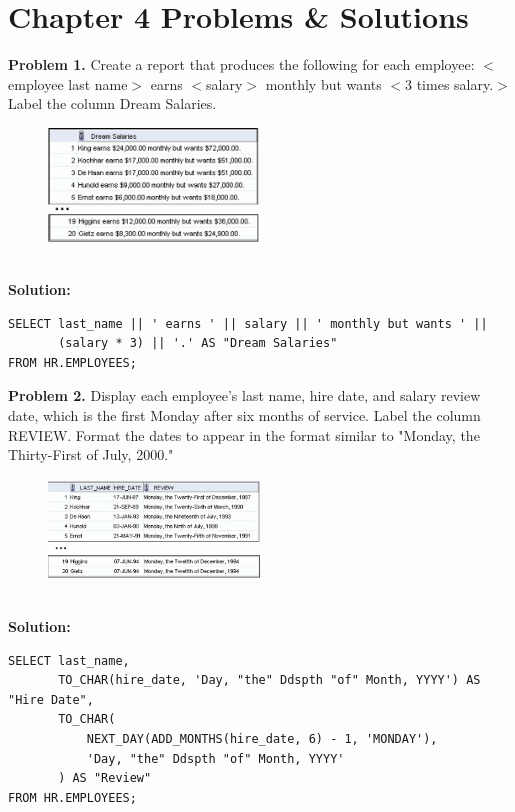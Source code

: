 \documentclass[12pt,a4paper]{article}
\begin{document}
\section{Chapter 4 Problems \& Solutions}

\textbf{Problem 1.} Create a report that produces the following for each employee: $<$employee last name$>$ earns $<$salary$>$ monthly but wants $<$3 times salary.$>$ Label the column Dream Salaries.
\begin{figure}[htbp]
  \centering
  \includegraphics[width=0.5\textwidth]{Screenshots/41.png}
\end{figure}\\
\textbf{Solution:}
\begin{lstlisting}[style=sqlstyle]
SELECT last_name || ' earns ' || salary || ' monthly but wants ' || 
       (salary * 3) || '.' AS "Dream Salaries"
FROM HR.EMPLOYEES;
\end{lstlisting}

\vspace{0.5cm}

\textbf{Problem 2.} Display each employee's last name, hire date, and salary review date, which is the first Monday after six months of service. Label the column REVIEW. Format the dates to appear in the format similar to "Monday, the Thirty-First of July, 2000."
\begin{figure}[htbp]
  \centering
  \includegraphics[width=0.5\textwidth]{Screenshots/42.png}
\end{figure}\\
\textbf{Solution:}
\begin{lstlisting}[style=sqlstyle]
SELECT last_name,
       TO_CHAR(hire_date, 'Day, "the" Ddspth "of" Month, YYYY') AS "Hire Date",
       TO_CHAR(
           NEXT_DAY(ADD_MONTHS(hire_date, 6) - 1, 'MONDAY'),
           'Day, "the" Ddspth "of" Month, YYYY'
       ) AS "Review"
FROM HR.EMPLOYEES;
\end{lstlisting}
\end{document}
